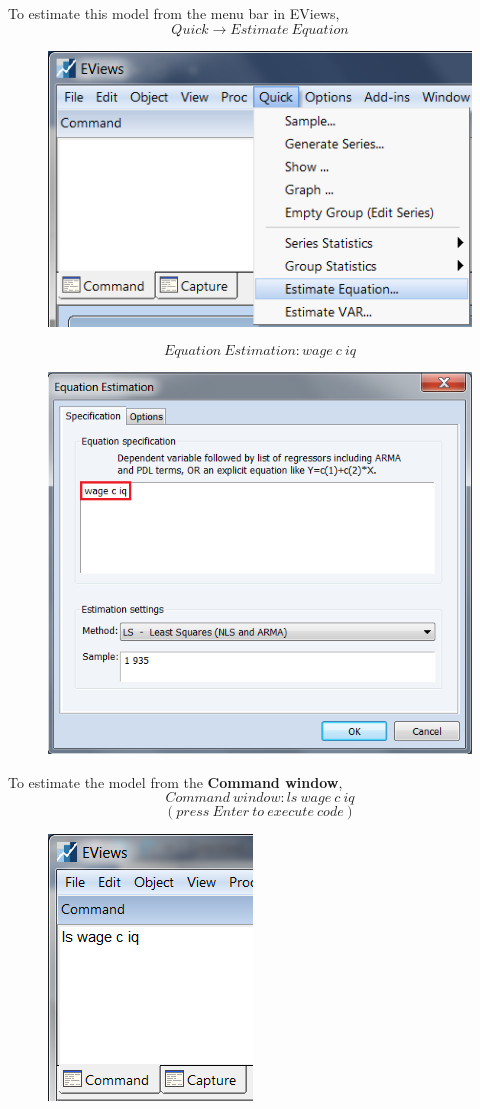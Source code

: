 \documentclass[12pt]{report}
\begin{document}
\noindent To estimate this model from the menu bar in EViews,
$$Quick \to Estimate\ Equation$$
\begin{figure}[H]
	\centering
	\includegraphics{q3_11}
\end{figure}
\vspace{-\baselineskip}
$$Equation\ Estimation: wage\ c\ iq$$
\begin{figure}[H]
	\centering
	\includegraphics{q3_12}
\end{figure}
\vspace{-\baselineskip}
\noindent To estimate the model from the \textbf{Command window},
$$Command\ window: ls\ wage\ c\ iq$$
$$(press\ Enter\ to\ execute\ code)$$
\begin{figure}[H]
	\centering
	\includegraphics{q3_13}
\end{figure}
\end{document}
